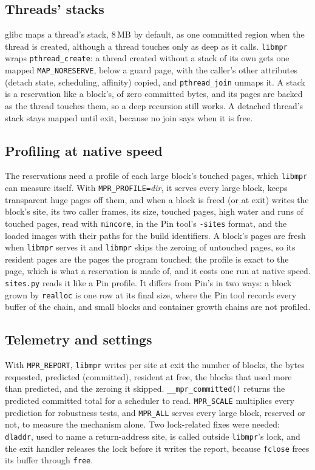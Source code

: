 \documentclass[11pt]{article}
\newcommand{\libmpr}{\texttt{libmpr}}
\begin{document}
\subsection{Threads' stacks}
\label{sec:stacks}

glibc maps a thread's stack, 8\,MB by default, as one committed region when the thread is created, although a
thread touches only as deep as it calls. \libmpr{} wraps \texttt{pthread\_create}: a thread created without a stack
of its own gets one mapped \texttt{MAP\_NORESERVE}, below a guard page, with the caller's other attributes
(detach state, scheduling, affinity) copied, and \texttt{pthread\_join} unmaps it. A stack is a reservation like
a block's, of zero committed bytes, and its pages are backed as the thread touches them, so a deep recursion
still works. A detached thread's stack stays mapped until exit, because no join says when it is free.

\subsection{Profiling at native speed}
\label{sec:nprof}

The reservations need a profile of each large block's touched pages, which \libmpr{} can measure itself. With
\texttt{MPR\_PROFILE=}\textit{dir}, it serves every large block, keeps transparent huge pages off them, and when a
block is freed (or at exit) writes the block's site, its two caller frames, its size, touched pages, high water and
runs of touched pages, read with \texttt{mincore}, in the Pin tool's \texttt{-sites} format, and the loaded images
with their paths for the build identifiers. A block's pages are fresh when \libmpr{} serves it and \libmpr{} skips the
zeroing of untouched pages, so its resident pages are the pages the program touched; the profile is exact to the
page, which is what a reservation is made of, and it costs one run at native speed. \texttt{sites.py} reads it like a
Pin profile. It differs from Pin's in two ways: a block grown by \texttt{realloc} is one row at its final size,
where the Pin tool records every buffer of the chain, and small blocks and container growth chains are not
profiled.

\subsection{Telemetry and settings}

With \texttt{MPR\_REPORT}, \libmpr{} writes per site at exit the number of blocks, the bytes requested,
predicted (committed), resident at free, the blocks that used more than predicted, and the zeroing it skipped.
\texttt{\_\_mpr\_committed()} returns the predicted committed total for a scheduler to read.
\texttt{MPR\_SCALE} multiplies every prediction for robustness tests, and \texttt{MPR\_ALL} serves every large block,
reserved or not, to measure the mechanism alone. Two lock-related fixes were needed: \texttt{dladdr}, used to name
a return-address site, is called outside \libmpr{}'s lock, and the exit handler releases the lock before it
writes the report, because \texttt{fclose} frees its buffer through \texttt{free}.
\end{document}
